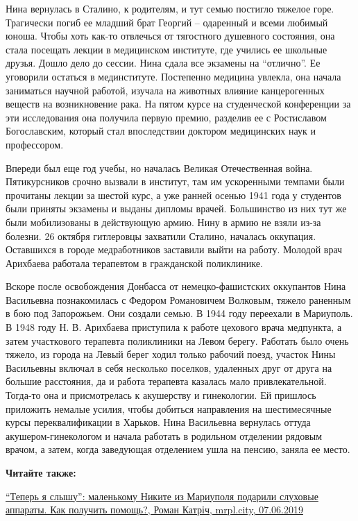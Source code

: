 Нина вернулась в Сталино, к родителям, и тут семью постигло тяжелое горе.
Трагически погиб ее младший брат Георгий – одаренный и всеми любимый юноша.
Чтобы хоть как-то отвлечься от тягостного душевного состояния, она стала
посещать лекции в медицинском институте, где учились ее школьные друзья. Дошло
дело до сессии. Нина сдала все экзамены на \enquote{отлично}. Ее уговорили остаться в
мединституте. Постепенно медицина увлекла, она начала заниматься научной
работой, изучала на животных влияние канцерогенных веществ на возникновение
рака. На пятом курсе на студенческой конференции за эти исследования она
получила первую премию, разделив ее с Ростиславом Богославским, который стал
впоследствии доктором медицинских наук и профессором.

Впереди был еще год учебы, но началась Великая Отечественная война.
Пятикурсников срочно вызвали в институт, там им ускоренными темпами были
прочитаны лекции за шестой курс, а уже ранней осенью 1941 года у студентов были
приняты экзамены и выданы дипломы врачей. Большинство из них тут же были
мобилизованы в действующую армию. Нину в армию не взяли из-за болезни. 26
октября гитлеровцы захватили Сталино, началась оккупация. Оставшихся в городе
медработников заставили выйти на работу. Молодой врач Арихбаева работала
терапевтом в гражданской поликлинике.

Вскоре после освобождения Донбасса от немецко-фашистских оккупантов Нина
Васильевна познакомилась с Федором Романовичем Волковым, тяжело раненным в бою
под Запорожьем. Они создали семью. В 1944 году переехали в Мариуполь. В 1948
году Н. В. Арихбаева приступила к работе цехового врача медпункта, а затем
участкового терапевта поликлиники на Левом берегу. Работать было очень тяжело,
из города на Левый берег ходил только рабочий поезд, участок Нины Васильевны
включал в себя несколько поселков, удаленных друг от друга на большие
расстояния, да и работа терапевта казалась мало привлекательной. Тогда-то она и
присмотрелась к акушерству и гинекологии. Ей пришлось приложить немалые усилия,
чтобы добиться направления на шестимесячные курсы переквалификации в Харьков.
Нина Васильевна вернулась оттуда акушером-гинекологом и начала работать в
родильном отделении рядовым врачом, а затем, когда заведующая отделением ушла
на пенсию, заняла ее место.

\textbf{Читайте также:} 

\href{https://mrpl.city/news/view/teper-ya-slyshu-malenkomu-nikite-iz-mariupolya-podarili-sluhovye-apparaty-kak-poluchit-pomoshh}{%
\enquote{Теперь я слышу}: маленькому Никите из Мариуполя подарили слуховые аппараты. Как получить помощь?, Роман Катріч, mrpl.city, 07.06.2019}

